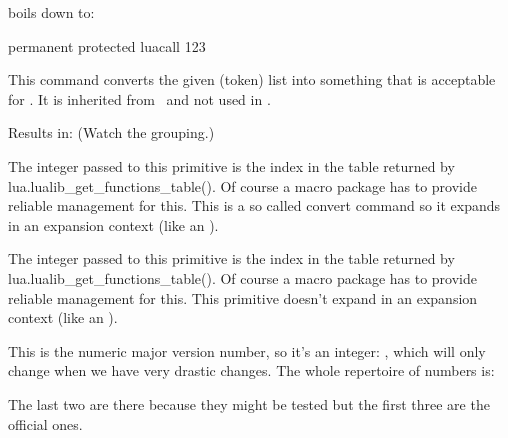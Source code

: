 boils down to:

\starttyping
permanent protected luacall 123
\stoptyping

\stopnewprimitive

\startnewprimitive[title={\prm {luaescapestring}}]

This command converts the given (token) list into something that is acceptable
for \LUA. It is inherited from \LUATEX\ and not used in \CONTEXT.

\startbuffer
{}
\stopbuffer

\typebuffer

Results in: \inlinebuffer\space (Watch the grouping.)

\stopnewprimitive

\startnewprimitive[title={\prm {luafunction}}]

The integer passed to this primitive is the index in the table returned by \typ
{lua.lualib_get_functions_table()}. Of course a macro package has to provide
reliable management for this. This is a so called convert command so it expands
in an expansion context (like an ).

\stopnewprimitive

\startnewprimitive[title={\prm {luafunctioncall}}]

The integer passed to this primitive is the index in the table returned by \typ
{lua.lualib_get_functions_table()}. Of course a macro package has to provide
reliable management for this. This primitive doesn't expand in an expansion
context (like an ).

\stopnewprimitive

\startnewprimitive[title={\prm {luametatexmajorversion}}]

This is the numeric major version number, so it's an integer: \the
\luametatexmajorversion, which will only change when we have very drastic
changes. The whole repertoire of numbers is:

\starttabulate
\NC \type {\the\luametatexmajorversion} \NC \the\luametatexmajorversion \NC \NR
\NC \type {\the\luametatexminorversion} \NC \the\luametatexminorversion \NC \NR
\NC \type {\the\luametatexrelease}      \NC \the\luametatexrelease      \NC \NR
\NC \type {\the\luatexversion}          \NC \the\luatexversion          \NC \NR
\NC \type {\the\luatexrevision}         \NC \the\luatexrevision         \NC \NR
\stoptabulate

The last two are there because they might be tested but the first three are the
official ones.

